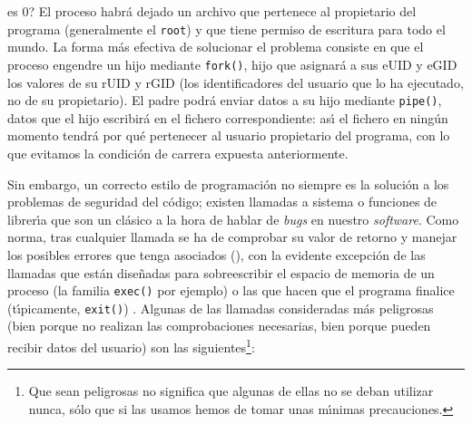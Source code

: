 \begin{itemize}
es 0? El proceso habr\'a dejado un archivo que pertenece al propietario del
programa (generalmente el {\tt root}) y que tiene permiso de escritura para
todo el mundo. La forma m\'as efectiva de solucionar el problema consiste en
que el proceso engendre un hijo mediante {\tt fork()}, hijo que asignar\'a a sus
eUID y eGID los valores de su rUID y rGID (los identificadores del usuario que
lo ha ejecutado, no de su propietario). El padre podr\'a enviar datos a su hijo
mediante {\tt pipe()}, datos que el hijo escribir\'a en el fichero 
correspondiente: as\'{\i} el fichero en ning\'un momento tendr\'a por qu\'e 
pertenecer al usuario propietario del programa, con lo que evitamos la 
condici\'on de carrera expuesta anteriormente.
\end{itemize}
Sin embargo, un correcto estilo de programaci\'on no siempre es la soluci\'on a
los problemas de seguridad del c\'odigo; existen llamadas a sistema o funciones
de librer\'{\i}a que son un cl\'asico a la hora de hablar de {\it bugs} en 
nuestro {\it software}. Como norma, tras cualquier llamada se ha de comprobar su
valor de retorno y manejar los posibles errores que tenga asociados 
(\cite{kn:sho00}), con la evidente excepci\'on de las llamadas que est\'an 
dise\~nadas para sobreescribir el espacio de memoria de un proceso (la familia 
{\tt exec()} por ejemplo) o las que hacen que el programa finalice 
(t\'{\i}picamente, {\tt exit()}) . Algunas de las llamadas consideradas m\'as 
peligrosas (bien porque no realizan las comprobaciones necesarias, bien porque 
pueden recibir datos del usuario) son las siguientes\footnote{Que sean 
peligrosas no significa que algunas de ellas no se deban utilizar nunca, s\'olo
que si las usamos hemos de tomar unas m\'{\i}nimas precauciones.}:
